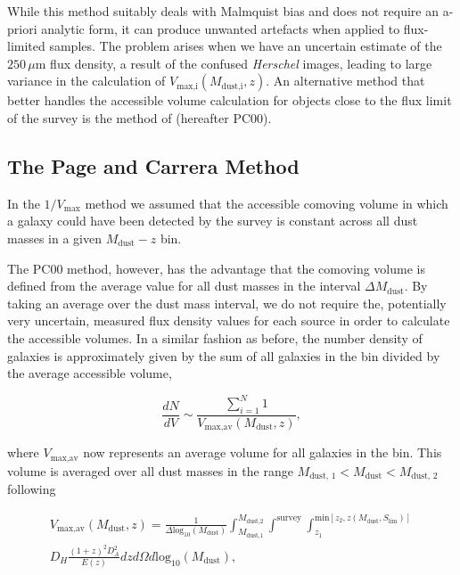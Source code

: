 While this method suitably deals with Malmquist bias and does not require an a-priori analytic form, it can produce unwanted artefacts when applied to flux-limited samples. The problem arises when we have an uncertain estimate of the $250\,\mu$m flux density, a result of the confused \textit{Herschel} images, leading to large variance in the calculation of $V_{\textrm{max,i}}(M_{\textrm{dust,i}},z)$. An alternative method that better handles the accessible volume calculation for objects close to the flux limit of the survey is the method of \citealt{Page_2000} (hereafter PC00).

\subsection{The Page and Carrera Method}

In the $1/V_{\textrm{max}}$ method we assumed that the accessible comoving volume in which a galaxy could have been detected by the survey is constant across all dust masses in a given $M_{\textrm{dust}} - z$ bin.

The PC00 method, however, has the advantage that the comoving volume is defined from the average value for all dust masses in the interval $\Delta M_{\textrm{dust}}$. By taking an average over the dust mass interval, we do not require the, potentially very uncertain, measured flux density values for each source in order to calculate the accessible volumes. In a similar fashion as before, the number density of galaxies is approximately given by the sum of all galaxies in the bin divided by the average accessible volume, 

\begin{equation}
    \frac{dN}{dV} \sim \frac{\sum_{i=1}^N 1}{V_{\textrm{max,av}}(M_{\textrm{dust}},z)},
\label{eq:number_density_pc00_method}
\end{equation}

\noindent where $V_{\textrm{max,av}}$ now represents an average volume for all galaxies in the bin. This volume is averaged over all dust masses in the range $M_{\textrm{dust, 1}} < M_{\textrm{dust}} < M_{\textrm{dust, 2}}$ following

\begin{multline}
    V_{\textrm{max,av}}(M_{\textrm{dust}},z) = \frac{1}{\Delta \textrm{log}_{10}(M_\textrm{dust})}\int_{\scriptscriptstyle M_{\textrm{dust,1}}}^{\scriptscriptstyle M_{\textrm{dust,2}}} \int^{\scriptscriptstyle \textrm{survey}} \int_{\scriptscriptstyle z_1}^{\scriptscriptstyle \textrm{min}[z_2, z(M_{\textrm{dust}},S_{\textrm{lim}})]} \\ D_H \frac{(1+z)^2 D_A^2}{E(z)} dz d\Omega d\textrm{log}_{10}(M_\textrm{dust}),
\label{eq:volume_pc00_method}
\end{multline}

